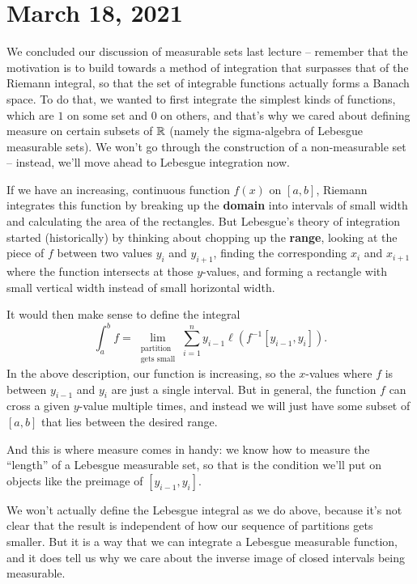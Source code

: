 \pagebreak\section*{March 18, 2021}

We concluded our discussion of measurable sets last lecture -- remember that the motivation is to build towards a method of integration that surpasses that of the Riemann integral, so that the set of integrable functions actually forms a Banach space. To do that, we wanted to first integrate the simplest kinds of functions, which are $1$ on some set and $0$ on others, and that's why we cared about defining measure on certain subsets of $\mathbb R$ (namely the sigma-algebra of Lebesgue measurable sets). We won't go through the construction of a non-measurable set -- instead, we'll move ahead to Lebesgue integration now. 

\begin{fact}[Informal]
If we have an increasing, continuous function $f(x)$ on $[a, b]$, Riemann integrates this function by breaking up the \textbf{domain} into intervals of small width and calculating the area of the rectangles. But Lebesgue's theory of integration started (historically) by thinking about chopping up the \textbf{range}, looking at the piece of $f$ between two values $y_i$ and $y_{i+1}$, finding the corresponding $x_i$ and $x_{i+1}$ where the function intersects at those $y$-values, and forming a rectangle with small vertical width instead of small horizontal width. 
\end{fact}

It would then make sense to define the integral
\[
    \int_a^b f = \lim_{\substack{\text{partition} \\ \text{gets small}}} \sum_{i=1}^n y_{i-1} \ell(f^{-1}[y_{i-1}, y_i]).
\]
In the above description, our function is increasing, so the $x$-values where $f$ is between $y_{i-1}$ and $y_i$ are just a single interval. But in general, the function $f$ can cross a given $y$-value multiple times, and instead we will just have some subset of $[a, b]$ that lies between the desired range. 

And this is where measure comes in handy: we know how to measure the ``length'' of a Lebesgue measurable set, so that is the condition we'll put on objects like the preimage of $[y_{i-1}, y_i]$. 

We won't actually define the Lebesgue integral as we do above, because it's not clear that the result is independent of how our sequence of partitions gets smaller. But it is a way that we can integrate a Lebesgue measurable function, and it does tell us why we care about the inverse image of closed intervals being measurable. 

